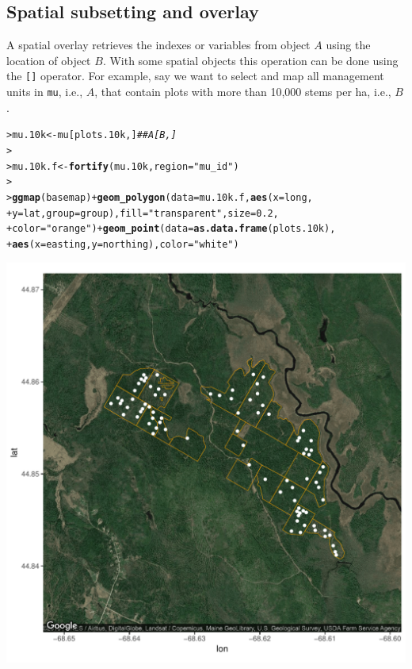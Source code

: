 \documentclass[12pt,oneside]{book}\usepackage[]{graphicx}\usepackage[]{color}
\makeatletter
\def\maxwidth{ %
  \ifdim\Gin@nat@width>\linewidth
    \linewidth
  \else
    \Gin@nat@width
  \fi
}
\newcommand{\hlnum}[1]{\textcolor[rgb]{0.686,0.059,0.569}{#1}}%
\newcommand{\hlstr}[1]{\textcolor[rgb]{0.192,0.494,0.8}{#1}}%
\newcommand{\hlcom}[1]{\textcolor[rgb]{0.678,0.584,0.686}{\textit{#1}}}%
\newcommand{\hlopt}[1]{\textcolor[rgb]{0,0,0}{#1}}%
\newcommand{\hlstd}[1]{\textcolor[rgb]{0.345,0.345,0.345}{#1}}%
\newcommand{\hlkwb}[1]{\textcolor[rgb]{0.69,0.353,0.396}{#1}}%
\newcommand{\hlkwc}[1]{\textcolor[rgb]{0.333,0.667,0.333}{#1}}%
\newcommand{\hlkwd}[1]{\textcolor[rgb]{0.737,0.353,0.396}{\textbf{#1}}}%
\newenvironment{kframe}{%
 \def\at@end@of@kframe{}%
 \ifinner\ifhmode%
  \def\at@end@of@kframe{\end{minipage}}%
  \begin{minipage}{\columnwidth}%
 \fi\fi%
 \def\FrameCommand##1{\hskip\@totalleftmargin \hskip-\fboxsep
 \colorbox{shadecolor}{##1}\hskip-\fboxsep
     \hskip-\linewidth \hskip-\@totalleftmargin \hskip\columnwidth}%
 \MakeFramed {\advance\hsize-\width
   \@totalleftmargin\z@ \linewidth\hsize
   \@setminipage}}%
 {\par\unskip\endMakeFramed%
 \at@end@of@kframe}
\newenvironment{knitrout}{}{} %
\makeatother
\begin{document}
\subsection{Spatial subsetting and overlay}\label{SEC:SPSUBSET}
A spatial overlay retrieves the indexes or variables from object $A$ using the location of object $B$. With some spatial objects this operation can be done using the \verb+[]+ operator. For example, say we want to select and map all management units in \verb+mu+, i.e., $A$, that contain plots with more than 10,000 stems per ha, i.e., $B$. 
\begin{knitrout}
\color{fgcolor}\begin{kframe}
\begin{alltt}
\hlstd{> }\hlstd{mu.10k} \hlkwb{<-} \hlstd{mu[plots.10k, ]}  \hlcom{## A[B,]}
\hlstd{> }
\hlstd{> }\hlstd{mu.10k.f} \hlkwb{<-} \hlkwd{fortify}\hlstd{(mu.10k,} \hlkwc{region} \hlstd{=} \hlstr{"mu_id"}\hlstd{)}
\hlstd{> }
\hlstd{> }\hlkwd{ggmap}\hlstd{(basemap)} \hlopt{+} \hlkwd{geom_polygon}\hlstd{(}\hlkwc{data} \hlstd{= mu.10k.f,} \hlkwd{aes}\hlstd{(}\hlkwc{x} \hlstd{= long,}
\hlstd{+ }    \hlkwc{y} \hlstd{= lat,} \hlkwc{group} \hlstd{= group),} \hlkwc{fill} \hlstd{=} \hlstr{"transparent"}\hlstd{,} \hlkwc{size} \hlstd{=} \hlnum{0.2}\hlstd{,}
\hlstd{+ }    \hlkwc{color} \hlstd{=} \hlstr{"orange"}\hlstd{)} \hlopt{+} \hlkwd{geom_point}\hlstd{(}\hlkwc{data} \hlstd{=} \hlkwd{as.data.frame}\hlstd{(plots.10k),}
\hlstd{+ }    \hlkwd{aes}\hlstd{(}\hlkwc{x} \hlstd{= easting,} \hlkwc{y} \hlstd{= northing),} \hlkwc{color} \hlstd{=} \hlstr{"white"}\hlstd{)}
\end{alltt}
\end{kframe}
\includegraphics[width=\maxwidth]{figure/unnamed-chunk-202-1} 

\end{knitrout}
\end{document}
